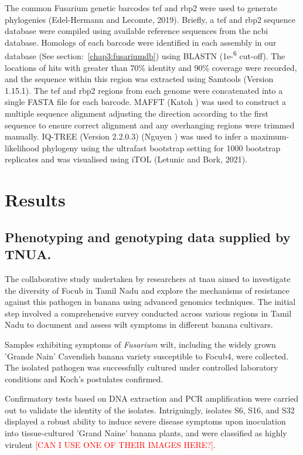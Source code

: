 The common Fusarium genetic barcodes \ac{tef} and \ac{rbp2} were used to generate phylogenies (Edel-Hermann and Lecomte, 2019). Briefly, a \ac{tef} and \ac{rbp2} sequence database were compiled using available reference sequences from the \ac{ncbi} database. Homologs of each barcode were identified in each assembly in our database (See section:~\ref{chap3:fusariumdb}) using BLASTN (1e-\textsuperscript{6} cut-off). The locations of hits with greater than 70\% identity and 90\% coverage were recorded, and the sequence within this region was extracted using Samtools (Version 1.15.1). The \ac{tef} and \ac{rbp2} regions from each genome were concatenated into a single FASTA file for each barcode. MAFFT (Katoh ) was used to construct a multiple sequence alignment adjusting the direction according to the first sequence to ensure correct alignment and any overhanging regions were trimmed manually. IQ-TREE (Version 2.2.0.3) (Nguyen ) was used to infer a maximum-likelihood phylogeny using the ultrafast bootstrap setting for 1000 bootstrap replicates and was visualised using iTOL (Letunic and Bork, 2021). 




\section{Results}
\subsection{Phenotyping and genotyping data supplied by TNUA.}

The collaborative study undertaken by researchers at \acs{tnau} aimed to investigate the diversity of \ac{Focub} in Tamil Nadu and explore the mechanisms of resistance against this pathogen in banana using advanced genomics techniques. The initial step involved a comprehensive survey conducted across various regions in Tamil Nadu to document and assess wilt symptoms in different banana cultivars.

Samples exhibiting symptoms of \textit{Fusarium} wilt, including the widely grown 'Grande Nain' Cavendish banana variety susceptible to \acs{Focub4}, were collected. The isolated pathogen was successfully cultured under controlled laboratory conditions and Koch's postulates confirmed. 

Confirmatory tests based on DNA extraction and PCR amplification were carried out to validate the identity of the isolates. Intriguingly,  isolates S6, S16, and S32 displayed a robust ability to induce severe disease symptoms upon inoculation into tissue-cultured 'Grand Naine' banana plants, and were classified as highly virulent \textcolor{red}{[CAN I USE ONE OF THEIR IMAGES HERE?]}.

